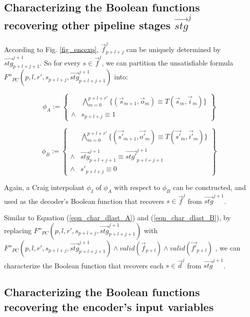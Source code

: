 \documentclass[conference]{IEEEtran}
\begin{document}
\subsection{Characterizing the Boolean functions recovering other pipeline stages $\vec{stg}^j$}
According to Fig. \ref{fig_encexp},
$\vec{f}^j_{p+l+j}$ can be uniquely determined by $\vec{stg}^{j+1}_{p+l+j+1}$.
So for every $s\in\vec{f}^j$,
we can partition the unsatisfiable formula $F''_{PC}(p,l,r',s_{p+l+j},\vec{stg}^{j+1}_{p+l+j+1})$ 
 into:

\begin{equation}
 \phi_A := 
 \left\{
\begin{array}{cc}
&\bigwedge_{m=0}^{p+l+r'}
\{
(\vec{s}_{m+1},\vec{o}_m)\equiv T(\vec{s}_m,\vec{i}_m)
\}
\\
\wedge& s_{p+l+j}\equiv 1 
\end{array}
\right\}
\end{equation}

\begin{equation}
\phi_B := 
\left\{
\begin{array}{cc}
&\bigwedge_{m=0}^{p+l+r'}
\{
(\vec{s'}_{m+1},\vec{o'}_m)\equiv T(\vec{s'}_m,\vec{i'}_m)
\}
\\
\wedge&\vec{stg}^{j+1}_{p+l+j+1}\equiv \vec{stg'}^{j+1}_{p+l+j+1} \\
\wedge& s'_{p+l+j}\equiv 0 
\end{array}
\right\}
\end{equation}

Again,
a Craig interpolant $\phi_I$ of $\phi_A$ with respect to $\phi_B$ can be constructed,
and used as the decoder's Boolean function that recovers $s\in\vec{f}^{j}$ from $\vec{stg}^{j+1}$.

Similar to Equation (\ref{eqn_char_dlast_A}) and (\ref{eqn_char_dlast_B}),
by replacing $F''_{PC}(p,l,r',s_{p+l+j},\vec{stg}^{j+1}_{p+l+j+1})$  with 
$F''_{PC}(p,l,r',s_{p+l+j},\vec{stg}^{j+1}_{p+l+j+1})\wedge valid(\vec{f}_{p+l})\wedge valid(\vec{f'}_{p+l})$ ,
we can characterize the Boolean function that recovers each $s\in\vec{d}^{j}$ from $\vec{stg}^{j+1}$.

\subsection{Characterizing the Boolean functions recovering the encoder's input variables}
\end{document}
